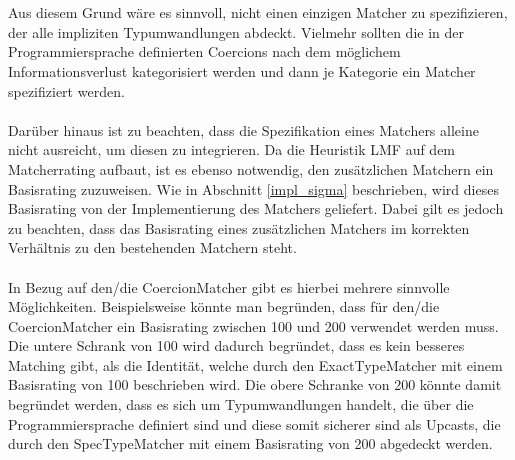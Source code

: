 \\\\
Aus diesem Grund wäre es sinnvoll, nicht einen einzigen Matcher zu spezifizieren, der alle impliziten Typumwandlungen abdeckt. Vielmehr sollten die in der Programmiersprache definierten Coercions nach dem möglichem Informationsverlust kategorisiert werden und dann je Kategorie ein Matcher spezifiziert werden.
\\\\
Darüber hinaus ist zu beachten, dass die Spezifikation eines Matchers alleine nicht ausreicht, um diesen zu integrieren. Da die Heuristik LMF auf dem Matcherrating aufbaut, ist es ebenso notwendig, den zusätzlichen Matchern ein Basisrating zuzuweisen. Wie in Abschnitt \ref{impl_sigma} beschrieben, wird dieses Basisrating von der Implementierung des Matchers geliefert. Dabei gilt es jedoch zu beachten, dass das Basisrating eines zusätzlichen Matchers im korrekten Verhältnis zu den bestehenden Matchern steht.
\\\\
In Bezug auf den/die CoercionMatcher gibt es hierbei mehrere sinnvolle Möglichkeiten. Beispielsweise könnte man begründen, dass für den/die CoercionMatcher ein Basisrating zwischen 100 und 200 verwendet werden muss. Die untere Schrank von 100 wird dadurch begründet, dass es kein besseres Matching gibt, als die Identität, welche durch den ExactTypeMatcher mit einem Basisrating von 100 beschrieben wird. Die obere Schranke von 200 könnte damit begründet werden, dass es sich um Typumwandlungen handelt, die über die Programmiersprache definiert sind und diese somit sicherer sind als Upcasts, die durch den SpecTypeMatcher mit einem Basisrating von 200 abgedeckt werden.

